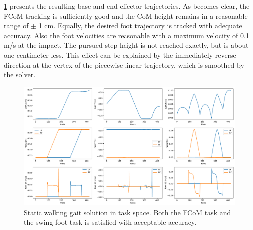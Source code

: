 \cref{fig:walkStatic_TaskSpace} presents the resulting base and end-effector trajectories. As becomes clear, the \gls{FCoM} tracking is sufficiently good and the \gls{CoM} height remains in a reasonable range of $\pm$ 1 cm. Equally, the desired foot trajectory is tracked with adequate accuracy. Also the foot velocities are reasonable with a maximum velocity of 0.1 m/s at the impact. The pursued step height is not reached exactly, but is about one centimeter less. This effect can be explained by the immediately reverse direction at the vertex of the piecewise-linear trajectory, which is smoothed by the solver.
\begin{figure}[h!]
\centering	
\includegraphics[width=1\textwidth]{fig/walkStatic/TaskSpace}
\caption[Static walking gait solution in task space]{Static walking gait solution in task space. Both the \gls{FCoM} task and the swing foot task is satisfied with acceptable accuracy.}
\label{fig:walkStatic_TaskSpace}
\end{figure} 

